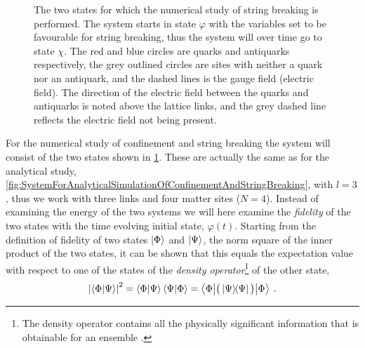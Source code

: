 \documentclass[../main.tex]{subfiles} %
\begin{document}
\begin{figure}[t]
    \caption{The two states for which the numerical study of string breaking is performed. The system starts in state $\varphi$ with the variables set to be favourable for string breaking, thus the system will over time go to state $\chi$. The red and blue circles are quarks and antiquarks respectively, the grey outlined circles are sites with neither a quark nor an antiquark, and the dashed lines is the gauge field (electric field). The direction of the electric field between the quarks and antiquarks is noted above the lattice links, and the grey dashed line reflects the electric field not being present.}
    \label{fig:SystemForNumericalSimulationOfConfinementAndStringBreaking}
\end{figure}

For the numerical study of confinement and string breaking the system will consist of the two states shown in \cref{fig:SystemForNumericalSimulationOfConfinementAndStringBreaking}. These are actually the same as for the analytical study, \cref{fig:SystemForAnalyticalSimulationOfConfinementAndStringBreaking}, with $l=3$, thus we work with three links and four matter sites ($N=4$). Instead of examining the energy of the two systems we will here examine the \emph{fidelity} of the two states with the time evolving initial state, $\varphi(t)$. Starting from the definition of fidelity of two states $\ket{\Phi}$ and $\ket{\Psi}$, the norm square of the inner product of the two states, it can be shown that this equals the expectation value with respect to one of the states of the \emph{density operator}\footnote{The density operator contains all the physically significant information that is obtainable for an ensemble \cite{sakurai_modernQM_2017}.} of the other state,
\begin{align}
    \abs{\innerproduct{\Phi}{\Psi}}^2
    = \innerproduct{\Phi}{\Psi}\innerproduct{\Psi}{\Phi}
    = \mel**{\Phi}{\big( \outerproduct{\Psi} \big)}{\Phi} \: .
\end{align}
\end{document}
